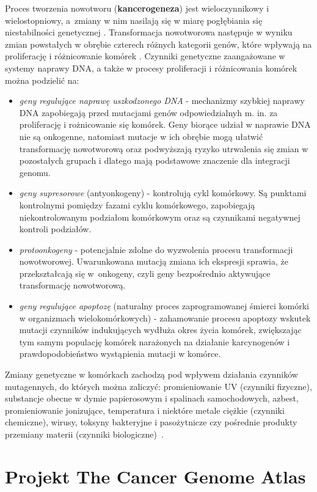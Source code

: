 Proces tworzenia nowotworu (\textbf{kancerogeneza}) jest wieloczynnikowy i wielostopniowy, a~zmiany w nim nasilają się w miarę pogłębiania się niestabilności genetycznej \cite{zikula2}. Transformacja nowotworowa następuje w wyniku zmian powstałych w obrębie czterech różnych kategorii genów, które wpływają na proliferację i różnicowanie komórek \cite{zikula}. Czynniki genetyczne zaangażowane w systemy naprawy DNA, a także w procesy proliferacji i różnicowania komórek \cite{zikula4} można podzielić na:  
\begin{itemize}
\item \textit{geny regulujące naprawę uszkodzonego DNA} - mechanizmy szybkiej naprawy DNA zapobiegają przed mutacjami genów odpowiedzialnyh m. in. za proliferację i rożnicowanie się komórek. Geny biorące udział w naprawie DNA nie są onkogenne, natomiast mutacje w ich obrębie mogą ułatwić transformację nowotworową oraz podwyższają ryzyko utrwalenia się zmian w pozostałych grupach i dlatego mają podstawowe znaczenie dla integracji genomu.
\item \textit{geny supresorowe} (antyonkogeny) - kontrolują cykl komórkowy. Są punktami kontrolnymi pomiędzy fazami cyklu komórkowego, zapobiegają niekontrolowanym podziałom komórkowym oraz są czynnikami negatywnej kontroli podziałów.
\item \textit{protoonkogeny} - potencjalnie zdolne do wyzwolenia procesu transformacji nowotworowej. Uwarunkowana mutacją zmiana ich ekspresji sprawia, że przekształcają się w~onkogeny, czyli geny bezpośrednio aktywujące transformację nowotworową.
\item \textit{geny regulujące apoptozę} (naturalny proces zaprogramowanej śmierci komórki w organizmach wielokomórkowych) - zahamowanie procesu apoptozy wskutek mutacji czynników indukujących wydłuża okres życia komórek, zwiększając tym samym populację komórek narażonych na działanie karcynogenów i prawdopodobieństwo wystąpienia mutacji w komórce.
\end{itemize}
Zmiany genetyczne w komórkach zachodzą pod wpływem działania czynników mutagennych, do których można zaliczyć: promieniowanie UV (czynniki fizyczne), substancje obecne w dymie papierosowym i spalinach samochodowych, azbest, promieniowanie jonizujące, temperatura i niektóre metale ciężkie (czynniki chemiczne), wirusy, toksyny bakteryjne i pasożytnicze czy pośrednie produkty przemiany materii (czynniki biologiczne)~\cite{zikula3}.


\section{Projekt The Cancer Genome Atlas}\label{chan:TCGA}

